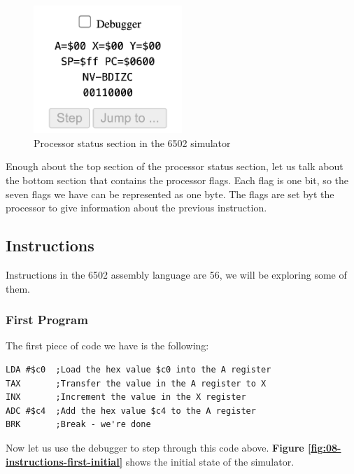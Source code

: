 \documentclass[a4paper]{article}
\begin{document}
\begin{figure}[H]
    \centering
    \includegraphics[width=0.5\textwidth]{res/images/q2/07-register-and-flags.png}
    \caption{Processor status section in the 6502 simulator}
    \label{fig:07-register-and-flags}
\end{figure}

Enough about the top section of the processor status section, let us talk about the bottom section that contains the processor flags. Each flag is one bit, so the seven flags we have can be represented as one byte. The flags are set byt the processor to give information about the previous instruction.

\subsection{Instructions}

Instructions in the 6502 assembly language are 56, we will be exploring some of them.

\subsubsection{First Program}

The first piece of code we have is the following:

\begin{lstlisting}[style=6502asm]
LDA #$c0  ;Load the hex value $c0 into the A register
TAX       ;Transfer the value in the A register to X
INX       ;Increment the value in the X register
ADC #$c4  ;Add the hex value $c4 to the A register
BRK       ;Break - we're done
\end{lstlisting}

Now let us use the debugger to step through this code above. \textbf{Figure \ref{fig:08-instructions-first-initial}} shows the initial state of the simulator.
\end{document}
